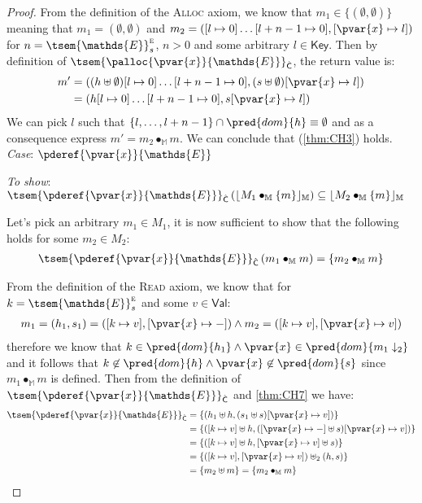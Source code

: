 {\begin{proof}
From the definition of the \textsc{Alloc} axiom, we know that $m_1 \in \{ (\emptyset, \emptyset) \}$ meaning that $m_1 = (\emptyset, \emptyset)$ and $m_2 = \left([l \mapsto 0]\ldots[l + n - 1 \mapsto 0], [\pvar{x} \mapsto l] \right)$ for $n = \tsem{\mathds{E}}_s^\textsc{e}$, $n > 0$ and some arbitrary $l \in \mathsf{Key}$. Then by definition of $\tsem{\palloc{\pvar{x}}{\mathds{E}}}_{\hat{\mathsf{C}}}$, the return value is:
\begin{align*}
	m' &= ((h \uplus \emptyset)[l \mapsto 0]\ldots[l + n - 1 \mapsto 0], (s \uplus \emptyset)[\pvar{x} \mapsto l]) \\
	&= (h[l \mapsto 0]\ldots[l + n - 1 \mapsto 0], s[\pvar{x} \mapsto l])
\end{align*}
We can pick $l$ such that $\{ l, \ldots, l + n -1 \} \cap \pred{dom}{h} \equiv \emptyset$ and as a consequence express $m' = m_2 \bullet_\mathbb{M} m$. We can conclude that (\ref{thm:CH3}) holds. \\

\textit{Case}: $\pderef{\pvar{x}}{\mathds{E}}$

\textit{To show}: $\tsem{\pderef{\pvar{x}}{\mathds{E}}}_{\hat{\mathsf{C}}} \left( \lfloor M_1 \bullet_\mathbb{M} \{m\} \rfloor_\mathbb{M} \right) \subseteq \lfloor M_2 \bullet_\mathbb{M} \{m\} \rfloor_\mathbb{M}$

Let's pick an arbitrary $m_1 \in M_1$, it is now sufficient to show that the following holds for some $m_2 \in M_2$:
\begin{gather}
	\label{thm:CH4} \tsem{\pderef{\pvar{x}}{\mathds{E}}}_{\hat{\mathsf{C}}} \left( m_1 \bullet_\mathbb{M} m\right) = \{m_2 \bullet_\mathbb{M} m\}
\end{gather}

From the definition of the \textsc{Read} axiom, we know that for $k = \tsem{\mathds{E}}_s^\textsc{e}$ and some $v \in \mathsf{Val}$:
\begin{gather}
	\label{thm:CH7}
	m_1 = (h_1, s_1) = ([k \mapsto v], [\pvar{x} \mapsto -]) \land m_2 = ([k \mapsto v], [\pvar{x} \mapsto v])
\end{gather}
therefore we know that $k \in \pred{dom}{h_1} \land \pvar{x} \in \pred{dom}{m_1 \downarrow_2}$ and it follows that $k \not\in \pred{dom}{h} \land \pvar{x} \not\in \pred{dom}{s}$ since $m_1 \bullet_\mathbb{M} m$ is defined. Then from the definition of $\tsem{\pderef{\pvar{x}}{\mathds{E}}}_{\hat{\mathsf{C}}}$ and \ref{thm:CH7} we have:
\begin{align*}
	\tsem{\pderef{\pvar{x}}{\mathds{E}}}_{\hat{\mathsf{C}}}
		&=
	\{ (h_1 \uplus h, (s_1 \uplus s)[\pvar{x} \mapsto v]) \} \\
		&=
	\{ ([k \mapsto v] \uplus h, ([\pvar{x} \mapsto -] \uplus s)[\pvar{x} \mapsto v]) \} \\
		&=
	\{ ([k \mapsto v] \uplus h, [\pvar{x} \mapsto v] \uplus s) \} \\
		&=
	\{ ([k \mapsto v], [\pvar{x} \mapsto v]) \uplus_2 (h, s) \} \\
		&=
	\{ m_2 \uplus m \} = \{ m_2 \bullet_\mathbb{M} m \}
\end{align*}


\end{proof}}
